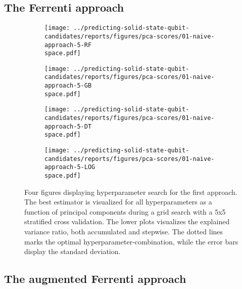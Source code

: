 \subsection{The Ferrenti approach}



\begin{figure}[!tbp]
  \begin{subfigure}[b]{0.5\textwidth}
    \texttt{[image: ../predicting-solid-state-qubit-candidates/reports/figures/pca-scores/01-naive-approach-5-RF\\space.pdf]}
    \caption{}
    \label{fig:q1-GB}
  \end{subfigure}%
  \hfill
  \begin{subfigure}[b]{0.5\textwidth}
    \texttt{[image: ../predicting-solid-state-qubit-candidates/reports/figures/pca-scores/01-naive-approach-5-GB\\space.pdf]}
    \caption{}
    \label{fig:q1-RF}
  \end{subfigure}

  \begin{subfigure}[b]{0.5\textwidth}
    \texttt{[image: ../predicting-solid-state-qubit-candidates/reports/figures/pca-scores/01-naive-approach-5-DT\\space.pdf]}
    \caption{}
    \label{fig:q1-DT}
  \end{subfigure}%
  \hfill
  \begin{subfigure}[b]{0.5\textwidth}
    \texttt{[image: ../predicting-solid-state-qubit-candidates/reports/figures/pca-scores/01-naive-approach-5-LOG\\space.pdf]}
    \caption{}
    \label{fig:q1-LOG}
  \end{subfigure}
  \vspace*{-95mm}
  \caption{{Four figures displaying hyperparameter search for the first approach. The best estimator is visualized for all hyperparameters as a function of principal components during a grid search with a 5x5 stratified cross validation. The lower plots visualizes the explained variance ratio, both accumulated and stepwise. The dotted lines marks the optimal hyperparameter-combination, while the error bars display the standard deviation. }}
\end{figure}

\clearpage

\subsection{The augmented Ferrenti approach}

